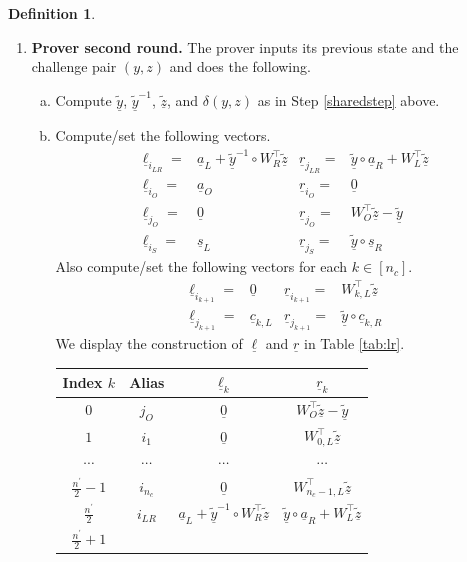\documentclass{article}
\theoremstyle{definition}
\newtheorem{definition}[theorem]{Definition}
\newcommand{\zq}{\widetilde{\underline{z}}}
\newcommand{\yq}{\widetilde{\underline{y}}}
\begin{document}
\begin{definition}
\begin{enumerate}
\item \textbf{Prover second round.} The prover inputs its previous state and the challenge pair $(y, z)$ and does the following.
\begin{enumerate}[(a)]
	\item Compute $\yq$, $\yq^{-1}$, $\zq$, and $\delta(y,z)$ as in Step \ref{sharedstep} above.
    \item Compute/set the following vectors.
    \begin{align*}
    	\underline{\ell}_{i_{LR}} =& \underline{a}_L + \yq^{-1} \circ W_R^\top \zq & \underline{r}_{j_{LR}} =& \yq \circ \underline{a}_R + W_L^\top \zq \\
		\underline{\ell}_{i_O} =& \underline{a}_O & \underline{r}_{i_O} =& \underline{0} \\
		\underline{\ell}_{j_O} =& \underline{0} & 
        \underline{r}_{j_O} =& W^\top_O \zq - \yq \\
		\underline{\ell}_{i_S} =& \underline{s}_L & \underline{r}_{j_S} =& \yq \circ \underline{s}_R
    \end{align*}
    Also compute/set the following vectors  for each $k \in [n_c]$.
	\begin{align*}
		\underline{\ell}_{i_{k+1}} =&  \underline{0} & \underline{r}_{i_{k+1}} =& W^\top_{k,L} \zq \\
		\underline{\ell}_{j_{k+1}} =&  \underline{c}_{k,L}& \underline{r}_{j_{k+1}} =& \yq \circ \underline{c}_{k,R}
    \end{align*}
    We display the construction of $\underline{\ell}$ and $\underline{r}$ in Table \ref{tab:lr}.
    \begin{table}[h!]
\centering
\begin{tabular}{|c|c|c|c|}
\hline
Index $k$ 
    & Alias
    & $\underline{\ell}_k$ 
    & $\underline{r}_k$ \\
\hline
$0$ 
    & $j_O$
    & $\underline{0}$ 
    & $W^\top_O \zq - \yq$ \\
\hline
$1$ 
    & $i_1$
    & $\underline{0}$ 
    & $W_{0,L}^\top \zq$ \\
\hline
$\cdots$ 
    & $\cdots$ 
    & $\cdots$ 
    & $\cdots$ \\
\hline
$\frac{n^\prime}{2}-1$ 
    & $i_{n_c}$
    & $\underline{0}$ 
    & $W_{n_c-1,L}^\top \zq$ \\
\hline
$\frac{n^\prime}{2}$
    & $i_{LR}$
    & $\underline{a}_L + \yq^{-1} \circ W_R^\top\zq$ 
    & $\yq \circ \underline{a}_R + W_L^\top\zq$ \\
\hline
$\frac{n^\prime}{2}+1$ 

\end{tabular}
\end{table}
\end{enumerate}
\end{enumerate}
\end{definition}
\end{document}
